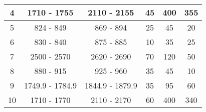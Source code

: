 \begin{table}[]
\begin{tabular}{|c|c|c|c|c|c|}
4                                                           & 1710 - 1755                                            & 2110 - 2155                                              & 45                                                                   & 400                                                              & 355                                                         \\ \hline
5                                                           & 824 - 849                                              & 869 - 894                                                & 25                                                                   & 45                                                               & 20                                                          \\ \hline
6                                                           & 830 - 840                                              & 875 - 885                                                & 10                                                                   & 35                                                               & 25                                                          \\ \hline
7                                                           & 2500 - 2570                                            & 2620 - 2690                                              & 70                                                                   & 120                                                              & 50                                                          \\ \hline
8                                                           & 880 - 915                                              & 925 - 960                                                & 35                                                                   & 45                                                               & 10                                                          \\ \hline
9                                                           & 1749.9 - 1784.9                                        & 1844.9 - 1879.9                                          & 35                                                                   & 95                                                               & 60                                                          \\ \hline
10                                                          & 1710 - 1770                                            & 2110 - 2170                                              & 60                                                                   & 400                                                              & 340                                                         \\ \hline

\end{tabular}
\end{table}
